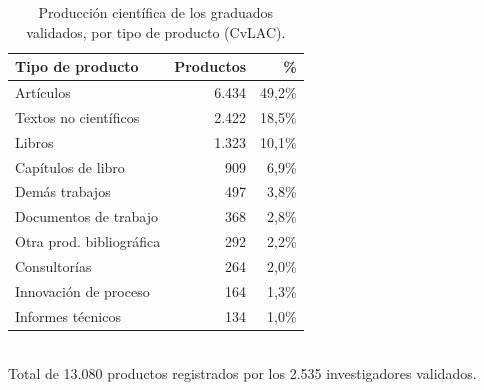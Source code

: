 \begin{table}[H]\centering\footnotesize
\caption{Producción científica de los graduados validados, por tipo de producto (CvLAC).}\label{tab:cvlac_prod}
\begin{tabular}{lrr}
\toprule
\rowcolor{ustaazul}\textbf{\color{white}Tipo de producto} & \textbf{\color{white}Productos} & \textbf{\color{white}\%} \\
\midrule
Artículos & 6.434 & 49,2\% \\
Textos no científicos & 2.422 & 18,5\% \\
Libros & 1.323 & 10,1\% \\
Capítulos de libro & 909 & 6,9\% \\
Demás trabajos & 497 & 3,8\% \\
Documentos de trabajo & 368 & 2,8\% \\
Otra prod. bibliográfica & 292 & 2,2\% \\
Consultorías & 264 & 2,0\% \\
Innovación de proceso & 164 & 1,3\% \\
Informes técnicos & 134 & 1,0\% \\
\bottomrule
\end{tabular}
\\[2pt]{\scriptsize\color{ustagris} Total de 13.080 productos registrados por los 2.535 investigadores validados.}
\end{table}